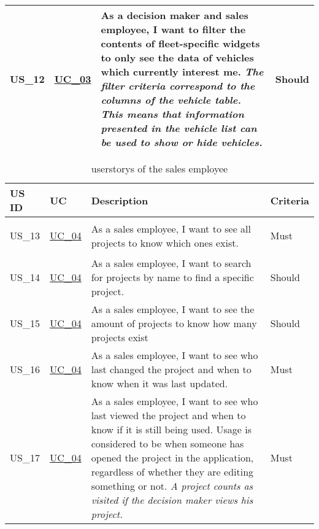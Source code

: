 \begin{footnotesize}
\begin{longtable}[L L L L]{ p{} p{} p{} p{}}
      \rowcolor{Gray}
      \hypertarget{Ref:US12}{US\_12} & \hyperlink{Ref:UC3}{UC\_03} & As a decision maker and sales employee, I want to filter the contents of fleet-specific \glspl{widget} to only see the data of vehicles which currently interest me.
      \newline
      \emph{The filter criteria correspond to the columns of the vehicle table. This means that information presented in the vehicle list can be used to show or hide vehicles.}
      & Should \\

      \bottomrule
    \end{longtable}
  \end{footnotesize}
  \rmfamily

  \sffamily
  \begin{footnotesize}
    \begin{longtable}[L L L L]{ p{} p{} p{} p{} }
      \caption                       %
          {\Glspl{userstory} of the sales employee} %
          \\
      \toprule
      \textbf{US ID} & \textbf{UC} & \textbf{Description} & \textbf{Criteria} \\
      \midrule
      \hypertarget{Ref:US13}{US\_13} & \hyperlink{Ref:UC4}{UC\_04} & As a sales employee, I want to see all projects to know which ones exist. & Must \\
      \hypertarget{Ref:US14}{US\_14} & \hyperlink{Ref:UC4}{UC\_04} & As a sales employee, I want to search for projects by name to find a specific project. & Should \\
      \hypertarget{Ref:US15}{US\_15} & \hyperlink{Ref:UC4}{UC\_04} & As a sales employee, I want to see the amount of projects to know how many projects exist & Should \\
      \hypertarget{Ref:US16}{US\_16} & \hyperlink{Ref:UC4}{UC\_04} & As a sales employee, I want to see who last changed the project and when to know when it was last updated. & Must \\
      \hypertarget{Ref:US17}{US\_17} & \hyperlink{Ref:UC4}{UC\_04} & As a sales employee, I want to see who last viewed the project and when to know if it is still being used. Usage is considered to be when someone has opened the project in the application, regardless of whether they are editing something or not.
      \newline
      \emph{A project counts as visited if the decision maker views his project.} & Must \\

\end{longtable}
\end{footnotesize}

